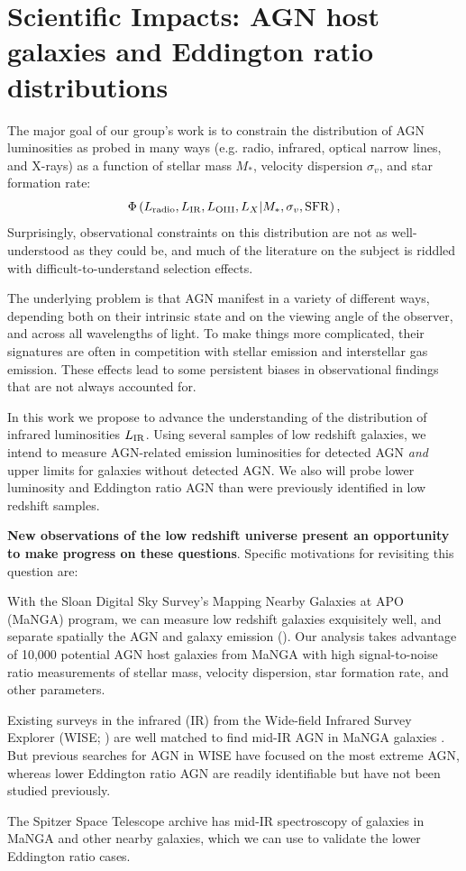 \documentclass[12pt, preprint]{hacked-aastex}
\newlength{\mylen}
\newenvironment{ditemize}
{ \begin{list}{}{%
\setlength{\topsep}{0pt}%
\setlength{\partopsep}{3pt}%
\setlength{\itemsep}{1pt}\setlength{\parsep}{1pt}%
\setlength{\itemindent}{0pt}\setlength{\listparindent}{12pt}%
\setlength{\leftmargin}{24pt}\setlength{\rightmargin}{0in}%
\setlength{\labelsep}{6pt}\setlength{\labelwidth}{6pt}%
\setlength{\mylen}{3pt}
\renewcommand{\makelabel}{\makebox[\labelwidth][l]{\raisebox{\mylen}{\tiny$\bullet$}\hspace{\fill}}}}}
{\end{list}}
\begin{document}
\section{Scientific Impacts: AGN host galaxies and Eddington ratio distributions}\label{sec:intro}

The major goal of our group's work is to constrain the 
distribution of AGN luminosities as probed in many ways 
(e.g. radio, infrared, optical narrow lines, and X-rays)
as a function of stellar mass $M_\ast$, velocity dispersion 
$\sigma_v$, and star formation rate:
\begin{equation}
\label{eq:model}
\Phi\left(L_{\rm radio}, L_{\rm IR}, L_{\rm OIII}, L_X | M_\ast, \sigma_v, {\rm SFR}\right),
\end{equation}
Surprisingly, observational constraints 
on this distribution are not as well-understood as they could be, and 
much of the literature on the subject is riddled with 
difficult-to-understand selection effects.

The underlying problem is that AGN
manifest in a variety of different ways, depending both
on their intrinsic state and on the viewing angle of 
the observer, and across all wavelengths of light. 
To make things more complicated, their signatures are
often in competition with stellar emission and interstellar
gas emission. These effects lead to some
persistent biases in observational findings that are
not always accounted for. 

In this work we propose to advance the understanding of the 
distribution of infrared luminosities $L_{\rm IR}$. Using 
several samples of low redshift galaxies, we intend to measure
AGN-related emission luminosities for detected AGN {\it and} 
upper limits for galaxies without detected AGN. We also will
probe lower luminosity and Eddington ratio AGN than were previously
identified in low redshift samples.

{\bf New observations of the low redshift universe present an 
opportunity to make progress on these questions}. Specific
motivations for revisiting this question are:
\begin{ditemize}
\item
With the Sloan Digital 
Sky Survey's Mapping Nearby Galaxies at APO (MaNGA) program, we can measure low
redshift galaxies exquisitely well, and separate spatially the AGN and 
galaxy emission (\cite{bundy15a, blanton17a}). 
Our analysis takes advantage of 10,000 potential AGN host galaxies from
MaNGA with  high signal-to-noise ratio measurements of stellar mass, velocity
dispersion, star formation rate, and other parameters.
\item Existing surveys in the infrared (IR) from the Wide-field Infrared Survey Explorer 
(WISE; \cite{wright10a}) are well matched to find mid-IR AGN in MaNGA galaxies 
\cite{comerford20a}. But previous searches for AGN in WISE have focused on
the most extreme AGN, whereas lower Eddington ratio AGN are readily identifiable
but have not been studied previously.
\item The Spitzer Space Telescope archive has mid-IR spectroscopy of galaxies in MaNGA
and other nearby galaxies, which we can use to validate the lower Eddington ratio 
cases. 
\end{ditemize}
\end{document}
